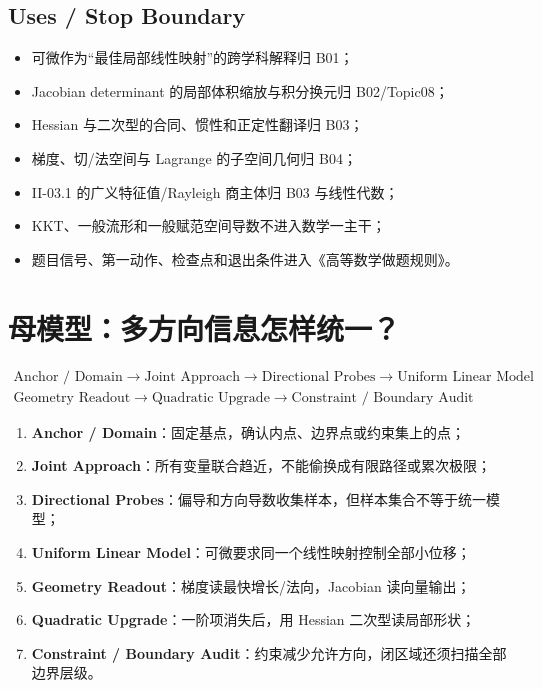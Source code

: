 \documentclass[11pt,a4paper,fontset=fandol]{ctexart}
\newcommand{\kw}[1]{\textbf{\color{deep}#1}}
\begin{document}
\subsection{Uses / Stop Boundary}
\begin{itemize}
  \item 可微作为“最佳局部线性映射”的跨学科解释归 B01；
  \item Jacobian determinant 的局部体积缩放与积分换元归 B02/Topic08；
  \item Hessian 与二次型的合同、惯性和正定性翻译归 B03；
  \item 梯度、切/法空间与 Lagrange 的子空间几何归 B04；
  \item II-03.1 的广义特征值/Rayleigh 商主体归 B03 与线性代数；
  \item KKT、一般流形和一般赋范空间导数不进入数学一主干；
  \item 题目信号、第一动作、检查点和退出条件进入《高等数学做题规则》。
\end{itemize}

\section{母模型：多方向信息怎样统一？}

\[
\boxed{\begin{gathered}
\text{Anchor / Domain}
\to\text{Joint Approach}
\to\text{Directional Probes}
\to\text{Uniform Linear Model}\\
\text{Geometry Readout}
\to\text{Quadratic Upgrade}
\to\text{Constraint / Boundary Audit}
\end{gathered}}
\]

\begin{enumerate}
  \item \kw{Anchor / Domain}：固定基点，确认内点、边界点或约束集上的点；
  \item \kw{Joint Approach}：所有变量联合趋近，不能偷换成有限路径或累次极限；
  \item \kw{Directional Probes}：偏导和方向导数收集样本，但样本集合不等于统一模型；
  \item \kw{Uniform Linear Model}：可微要求同一个线性映射控制全部小位移；
  \item \kw{Geometry Readout}：梯度读最快增长/法向，Jacobian 读向量输出；
  \item \kw{Quadratic Upgrade}：一阶项消失后，用 Hessian 二次型读局部形状；
  \item \kw{Constraint / Boundary Audit}：约束减少允许方向，闭区域还须扫描全部边界层级。
\end{enumerate}
\end{document}
